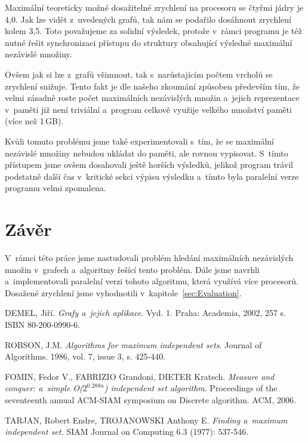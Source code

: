 \documentclass[12pt]{article}
\begin{document}
Maximální teoreticky možné dosažitelné zrychlení na procesoru se čtyřmi jádry je 4,0. Jak lze vidět z~uvedených grafů, tak nám se podařilo dosáhnout zrychlení kolem 3,5. Toto považujeme za solidní výsledek, protože v~rámci programu je též nutné řešit synchronizaci přístupu do struktury obsahující výsledné maximální nezávislé množiny. 

Ovšem jak si lze z~grafů všimnout, tak s~narůstajícím počtem vrcholů se zrychlení snižuje. Tento fakt je dle našeho zkoumání způsoben především tím, že velmi zásadně roste počet maximálních nezávislých množin a~jejich reprezentace v~paměti již není triviální a~program celkově využije velkého množství paměti (více než 1\,GB). 

Kvůli tomuto problému jsme také experimentovali s~tím, že se maximální nezávislé množiny nebudou ukládat do paměti, ale rovnou vypisovat. S~tímto přístupem jsme ovšem dosahovali ještě horších výsledků, jelikož program trávil podstatně další čas v~kritické sekci výpisu výsledku a~tímto byla paralelní verze programu velmi zpomalena. 

\section{Závěr}
V~rámci této práce jsme nastudovali problém hledání maximálních nezávislých množin v~grafech a~algoritmy řešící tento problém. Dále jsme navrhli a~implementovali paralelní verzi tohoto algoritmu, která využívá více procesorů. Dosažené zrychlení jsme vyhodnotili v~kapitole~\ref{sec:Evaluation}.


\begin{thebibliography}{99}

    DEMEL, Jiří. \emph{Grafy a~jejich aplikace}. Vyd. 1. Praha: Academia, 2002, 257 s. ISBN 80-200-0990-6.

ROBSON, J.M. \emph{Algorithms for maximum independent sets}. Journal of Algorithms. 1986, vol. 7, issue 3, s. 425-440.

  FOMIN, Fedor V., FABRIZIO Grandoni, DIETER Kratsch.
  \emph{Measure and conquer: a~simple O($2^{0.288n}$) independent set algorithm}.
  Proceedings of the seventeenth annual ACM-SIAM symposium on Discrete algorithm.
   ACM, 2006.

  TARJAN, Robert Endre, TROJANOWSKI Anthony E.
  \emph{Finding a~maximum independent set.}
  SIAM Journal on Computing 6.3 (1977): 537-546.

\end{thebibliography}
\end{document}
